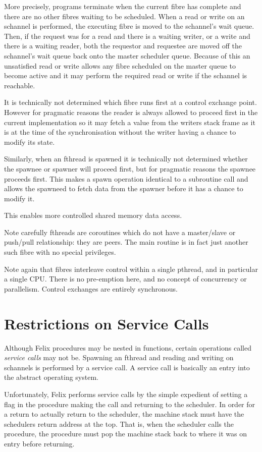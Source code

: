\documentclass{article}
\begin{document}
More precisely, programs terminate when the current fibre has
complete and there are no other fibres waiting to be scheduled.
When a read or write on an schannel is performed, the executing
fibre is moved to the schannel's wait queue. Then, if the
request was for a read and there is a waiting writer, or a write
and there is a waiting reader, both the requestor and requestee
are moved off the schannel's wait queue back onto the master
scheduler queue.  Because of this an unsatisfied read or write
allows any fibre scheduled on the master queue to become
active and it may perform the required read or write if 
the schannel is reachable.

It is technically not determined which fibre runs first
at a control exchange point. However for pragmatic
reasons the reader is always allowed to proceed first in
the current implementation so it may fetch a value from
the writers stack frame as it is at the time of the synchronisation
without the writer having a chance to modify its state.

Similarly, when an fthread is spawned it is technically not
determined whether the spawnee or spawner will proceed first,
but for pragmatic reasons the spawnee proceeds first.
This makes a spawn operation identical to a subroutine call
and allows the spawneed to fetch data from the spawner
before it has a chance to modify it.

This enables more controlled shared memory data access.

Note carefully fthreads are coroutines which do not have
a master/slave or push/pull relationship: they are peers.
The main routine is in fact just another such fibre
with no special privileges.

Note again that fibres interleave control within a single
pthread, and in particular a single CPU. There is no
pre-emption here, and no concept of concurrency or
parallelism. Control exchanges are entirely synchronous.

\section{Restrictions on Service Calls}
Although Felix procedures may be nested in functions,
certain operations called {\em service calls} may not be.
Spawning an fthread and reading and writing on schannels
is performed by a service call. A service call is basically
an entry into the abstract operating system.

Unfortunately, Felix performs service calls by the simple
expedient of setting a flag in the procedure making the
call and returning to the scheduler. In order for a
return to actually return to the scheduler, the machine
stack must have the schedulers return address at the top.
That is, when the scheduler calls the procedure, the procedure
must pop the machine stack back to where it was on entry
before returning.
\end{document}
